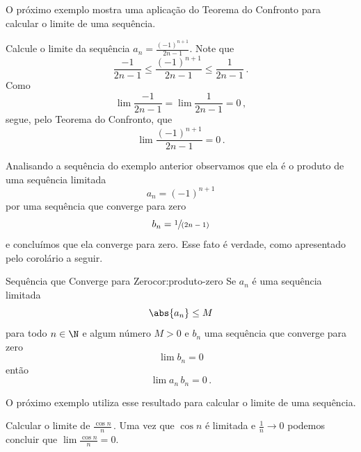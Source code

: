 O próximo exemplo mostra uma aplicação do Teorema do Confronto para calcular
o limite de uma sequência.

\begin{example}
  Calcule o limite da sequência
  \(
    a_n=\frac{(-1)^{n+1}}{2n-1}
  \).
  \solution
  Note que
  \[
    \frac{-1}{2n-1} \leq \frac{(-1)^{n+1}}{2n-1} \leq \frac{1}{2n-1}   \,.
  \]
  Como
  \[
    \lim\frac{-1}{2n-1} = \lim \frac{1}{2n-1} = 0  \,,
  \]
  segue, pelo Teorema do Confronto, que
  \[
    \lim \frac{(-1)^{n+1}}{2n-1} = 0   \,.
  \]
\end{example}

Analisando a sequência do exemplo anterior observamos que ela é o produto de
uma sequência limitada
\[
  a_n = (-1)^{n+1}
\]
por uma sequência que converge para zero
\[
  b_n = \sfrac{1}{(2n-1)}
\]
e concluímos que ela converge para zero.
Esse fato é verdade, como apresentado pelo corolário a seguir.

\begin{corolario}{Sequência que Converge para Zero}{cor:produto-zero}
  Se $a_n$ é uma sequência limitada
  \[
    \abs{a_n} \leq M
  \]
  para todo $n\in\N$ e algum número $M>0$ e $b_n$ uma sequência que
  converge para zero
  \[
    \lim b_n = 0
  \]
  então
  \[
    \lim a_n\, b_n = 0  \,.
  \]
\end{corolario}

O próximo exemplo utiliza esse resultado para calcular o limite de uma sequência.

\begin{example}
  Calcular o limite de
  \(
    \frac{\cos n}{n} \,.
  \)
  \solution
  Uma vez que $\cos n$ é limitada e
  \(
    \frac{1}{n} \to 0
  \)
  podemos concluir que
  \(
    \lim \frac{\cos n}{n} = 0
  \).
\end{example}

